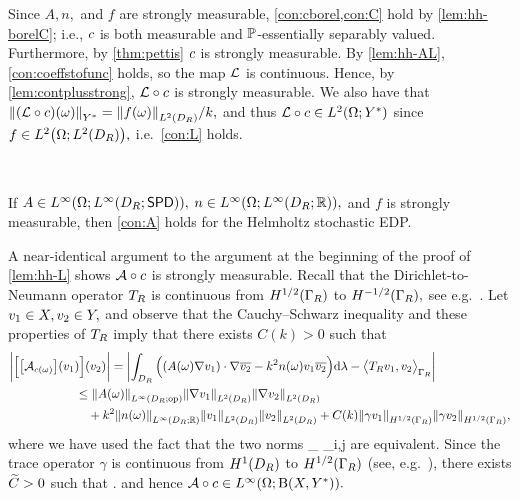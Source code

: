Since $A,n,$ and $f$ are strongly measurable, \cref{con:cborel,con:C} hold by \cref{lem:hh-borelC}; i.e., $c$ is both measurable and $\mathbb P$-essentially separably valued. Furthermore, by \cref{thm:pettis} $c$ is strongly measurable. By \cref{lem:hh-AL}, \cref{con:coeffstofunc} holds, so the map $\mathcal L$ is continuous. Hence, by \cref{lem:contplusstrong}, $\mathcal L\circ c$ is strongly measurable. We also have that
$\NYs{\mleft(\rhs\circ\coeff\mright)(\omega)} = \NLtDR{f(\omega)}/k,$
and thus $\rhs\circ\coeff \in \LtOYs$ since $f \in \LtOLtDR,$ i.e.~\cref{con:L} holds.
\epf

\label{lem:hh-A}

\

\noindent If $A \in \LiOLiDRRRdtd,$ $n \in \LiOLiDRRR,$ and $f$ is strongly measurable, then \cref{con:A} holds for the Helmholtz stochastic EDP.
\ele

A near-identical argument to the argument at the beginning of the proof of \cref{lem:hh-L} shows $\mathcal A\circ c$ is strongly measurable. Recall that the Dirichlet-to-Neumann operator $T_{R}$ is continuous from $\HhGR$ to $\HmhGR,$ see e.g.~\cite[Theorem 2.6.4]{Ne:01}. Let $v_{1} \in X, v_{2} \in Y,$ and observe that the Cauchy--Schwarz inequality and these properties of $T_{R}$
imply that there exists $C(k) > 0$ such that 
\begin{align*}
\bigg|\Big[\mleft[\Acomega\mright](\vo)\Big](\vt)\bigg| &= \abs{\int_{\DR} \Big(\mleft(A(\omega) \grad \vo\mright)\cdot\grad \vtb - k^2n(\omega) \vo\vtb \Big)\dd\Leb- \IPGRbig{\DtN \vo}{\vt}}\\
&\hspace{-1cm}\leq \NLiDRRRdtd{A(\omega)}  \NLtDR{\grad \vo}\NLtDR{\grad \vt}\\
&\hspace{-1cm}\quad+ k^2 \NLiDRRR{n(\omega)}\NLtDR{\vo}\NLtDR{\vt}+ C(k) \NHhGR{\gamma\vo}\NHhGR{\gamma\vt},
\end{align*}
where we have used the fact that the two norms
\beq\label{eq:normsdef}
 \esssup_{\bx \in \DR}  \quad\tand\quad{} \de \max_{i,j \in {}} 
\eeq
are equivalent.
Since the trace operator $\gamma$ is continuous from $\HoDR$ to $\HhGR$ (see, e.g.~\cite[Theorem 3.38]{Mc:00}), there exists $\widetilde{C} > 0$ such that
\beqs
\Nhomspace{\mleft(\toform\circ\coeff\mright)(\omega)}\leq\Ctilde\max{}\NHokDR{\vo}\NHokDR{\vt}.
\eeqs
and hence $\toform\circ\coeff \in \LiOhomspace.$
\epf

